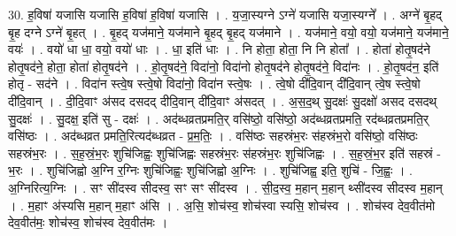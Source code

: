 \documentclass[17pt]{extarticle}
\begin{document}
30. ह॒विषा॑ यजासि यजासि ह॒विषा॑ ह॒विषा॑ यजासि । . य॒जा॒स्यग्ने ऽग्ने॑ यजासि यजा॒स्यग्ने᳚ । . अग्ने॑ बृ॒हद् बृ॒ह दग्ने ऽग्ने॑ बृ॒हत् । . बृ॒हद् यज॑माने॒ यज॑माने बृ॒हद् बृ॒हद् यज॑माने । . यज॑माने॒ वयो॒ वयो॒ यज॑माने॒ यज॑माने॒ वयः॑ । . वयो॑ धा धा॒ वयो॒ वयो॑ धाः । . धा॒ इति॑ धाः । . नि होता॒ होता॒ नि नि होता᳚ । . होता॑ होतृ॒षद॑ने होतृ॒षद॑ने॒ होता॒ होता॑ होतृ॒षद॑ने । . हो॒तृ॒षद॑ने॒ विदा॑नो॒ विदा॑नो होतृ॒षद॑ने होतृ॒षद॑ने॒ विदा॑नः । . हो॒तृ॒षद॑न॒ इति॑ होतृ - सद॑ने । . विदा॑न स्त्वे॒ष स्त्वे॒षो विदा॑नो॒ विदा॑न स्त्वे॒षः । . त्वे॒षो दी॑दि॒वान् दी॑दि॒वान् त्वे॒ष स्त्वे॒षो दी॑दि॒वान् । . दी॒दि॒वाꣳ अ॑सद दसदद् दीदि॒वान् दी॑दि॒वाꣳ अ॑सदत् । . अ॒स॒द॒थ् सु॒दक्षः॑ सु॒दक्षो॑ असद दसदथ् सु॒दक्षः॑ । . सु॒दक्ष॒ इति॑ सु - दक्षः॑ । . अद॑ब्धव्रतप्रमति॒र् वसि॑ष्ठो॒ वसि॑ष्ठो॒ अद॑ब्धव्रतप्रमति॒ रद॑ब्धव्रतप्रमति॒र् वसि॑ष्ठः । . अद॑ब्धव्रत प्रमति॒रित्यद॑ब्धव्रत - प्र॒म॒तिः॒ । . वसि॑ष्ठः सहस्रंभ॒रः स॑हस्रंभ॒रो वसि॑ष्ठो॒ वसि॑ष्ठः सहस्रंभ॒रः । . स॒ह॒स्रं॒भ॒रः शुचि॑जिह्वः॒ शुचि॑जिह्वः सहस्रंभ॒रः स॑हस्रंभ॒रः शुचि॑जिह्वः । . स॒ह॒स्रं॒भ॒र इति॑ सहस्रं - भ॒रः । . शुचि॑जिह्वो अ॒ग्नि र॒ग्निः शुचि॑जिह्वः॒ शुचि॑जिह्वो अ॒ग्निः । . शुचि॑जिह्व॒ इति॒ शुचि॑ - जि॒ह्वः॒ । . अ॒ग्निरित्य॒ग्निः । . सꣳ सी॑दस्व सीदस्व॒ सꣳ सꣳ सी॑दस्व । . सी॒द॒स्व॒ म॒हान् म॒हान् थ्सी॑दस्व सीदस्व म॒हान् । . म॒हाꣳ अ॑स्यसि म॒हान् म॒हाꣳ अ॑सि । . अ॒सि॒ शोच॑स्व॒ शोच॑स्वा स्यसि॒ शोच॑स्व । . शोच॑स्व देव॒वीत॑मो देव॒वीत॑मः॒ शोच॑स्व॒ शोच॑स्व देव॒वीत॑मः । \newline
\end{document}
